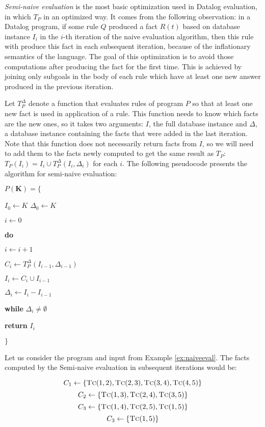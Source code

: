 \emph{Semi-naive evaluation} is the most basic optimization used in Datalog evaluation, in which $T_P$ in an optimized way. It comes from the following observation: in a Datalog program, if some rule $Q$ produced a fact $R(t)$ based on database instance $I_i$ in the $i$-th iteration of the naive evaluation algorithm, then this rule with produce this fact in each subsequent iteration, because of the inflationary semantics of the language. The goal of this optimization is to avoid those computations after producing the fact for the first time. This is achieved by joining only subgoals in the body of each rule which have at least one new answer produced in the previous iteration. 

Let $T^\Delta_P$ denote a function that evaluates rules of program $P$ so that at least one new fact is used in application of a rule. This function needs to know which facts are the new ones, so it takes two arguments: $I$, the full database instance and $\Delta$, a database instance containing the facts that were added in the last iteration. Note that this function does not necessarily return facts from $I$, so we will need to add them to the facts newly computed to get the same result as $T_P$: $T_P(I_i) = I_i \cup T_P^\Delta(I_i, \Delta_i)$ for each $i$. The following pseudocode presents the algorithm for semi-naive evaluation: 


\parbox{0.5\textwidth}{
$P(\textbf{K}) = \{$

{\addtolength{\leftskip}{5mm}

$I_0 \leftarrow K$
$\Delta_0 \leftarrow K$

$i \leftarrow 0$

\textbf{do}

{\addtolength{\leftskip}{5mm}

$i \leftarrow i + 1$

$C_i \leftarrow T_P^\Delta(I_{i-1}, \Delta_{i-1})$

$I_i \leftarrow C_i \cup I_{i-1}$

$\Delta_i \leftarrow I_i - I_{i-1}$

}

\textbf{while} $\Delta_i \ne \emptyset$

\textbf{return} $I_i$

}

$\}$
}



\begin{exmp}
Let us consider the program and input from Example \ref{ex:naiveeval}. The facts computed by the Semi-naive evaluation in subsequent iterations would be:

$$C_1 \leftarrow \{\textsc{Tc}(1, 2), \textsc{Tc}(2, 3), \textsc{Tc}(3, 4), \textsc{Tc}(4, 5)\}$$
$$C_2 \leftarrow \{\textsc{Tc}(1, 3), \textsc{Tc}(2, 4), \textsc{Tc}(3, 5)\}$$
$$C_3 \leftarrow \{\textsc{Tc}(1, 4), \textsc{Tc}(2, 5), \textsc{Tc}(1, 5)\}$$
$$C_3 \leftarrow \{\textsc{Tc}(1, 5)\}$$
\end{exmp}\label{ex:semieval}

